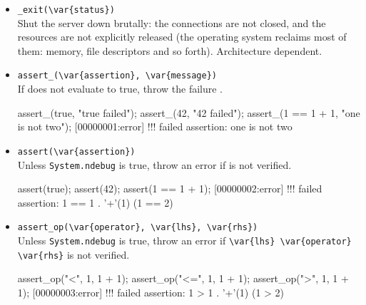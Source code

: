 \begin{itemize}

\item \lstinline'_exit(\var{status})'\\
  Shut the server down brutally: the connections are not closed, and
  the resources are not explicitly released (the operating system
  reclaims most of them: memory, file descriptors and so forth).
  Architecture dependent.

\item \lstinline|assert_(\var{assertion}, \var{message})|\\
  If  does not evaluate to true, throw the failure
  .
\begin{urbiscript}
assert_(true,       "true failed");
assert_(42,         "42 failed");
assert_(1 == 1 + 1, "one is not two");
[00000001:error] !!! failed assertion: one is not two
\end{urbiscript}

\item \lstinline|assert(\var{assertion})|\\
  Unless \lstinline|System.ndebug| is true, throw an error if
   is not verified.
\begin{urbiscript}[firstnumber=last]
assert(true);
assert(42);
assert(1 == 1 + 1);
[00000002:error] !!! failed assertion: 1 == 1 . '+'(1) (1 == 2)
\end{urbiscript}

\item \lstinline|assert_op(\var{operator}, \var{lhs}, \var{rhs})|\\
  Unless \lstinline|System.ndebug| is true, throw an error if
  \lstinline|\var{lhs} \var{operator} \var{rhs}| is not verified.
\begin{urbiscript}[firstnumber=last]
assert_op("<",  1, 1 + 1);
assert_op("<=", 1, 1 + 1);
assert_op(">",  1, 1 + 1);
[00000003:error] !!! failed assertion: 1 > 1 . '+'(1) (1 > 2)
\end{urbiscript}


\end{itemize}
